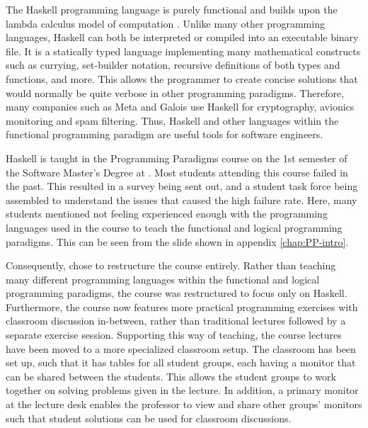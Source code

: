 The Haskell programming language is purely functional\cite{Haskell_landing} and builds upon the lambda calculus model of computation \cite{Haskell_book}.
Unlike many other programming languages, Haskell can both be interpreted or compiled into an executable binary file.
It is a statically typed language implementing many mathematical constructs such as currying, set-builder notation, recursive definitions of both types and functions, and more.
This allows the programmer to create concise solutions that would normally be quite verbose in other programming paradigms.
Therefore, many companies such as Meta and Galois use Haskell for cryptography, avionics monitoring and spam filtering\cite{Haskell_companies}.
Thus, Haskell and other languages within the functional programming paradigm are useful tools for software engineers.


Haskell is taught in the Programming Paradigms course on the 1st semester of the Software Master's Degree at \aau{}.
Most students attending this course failed in the past.
This resulted in a survey being sent out, and a student task force being assembled to understand the issues that caused the high failure rate.
Here, many students mentioned not feeling experienced enough with the programming languages used in the course to teach the functional and logical programming paradigms. This can be seen from the slide shown in appendix \ref{chap:PP-intro}.


Consequently, \aau{} chose to restructure the course entirely.
Rather than teaching many different programming languages within the functional and logical programming paradigms, the course was restructured to focus only on Haskell.
Furthermore, the course now features more practical programming exercises with classroom discussion in-between, rather than traditional lectures followed by a separate exercise session.
Supporting this way of teaching, the course lectures have been moved to a more specialized classroom setup. The classroom has been set up, such that it has tables for all student groups, each having a monitor that can be shared between the students. This allows the student groups to work together on solving problems given in the lecture.
In addition, a primary monitor at the lecture desk enables the professor to view and share other groups' monitors such that student solutions can be used for classroom discussions.


